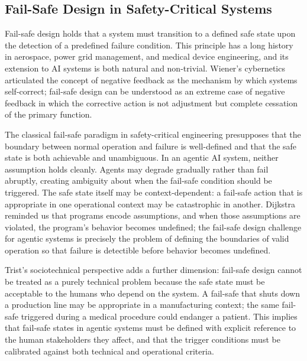 \subsection{Fail-Safe Design in Safety-Critical Systems}

Fail-safe design holds that a system must transition to a defined safe state upon the detection of a predefined failure condition. This principle has a long history in aerospace, power grid management, and medical device engineering, and its extension to AI systems is both natural and non-trivial. Wiener's cybernetics \cite{wiener1948} articulated the concept of negative feedback as the mechanism by which systems self-correct; fail-safe design can be understood as an extreme case of negative feedback in which the corrective action is not adjustment but complete cessation of the primary function.

The classical fail-safe paradigm in safety-critical engineering presupposes that the boundary between normal operation and failure is well-defined and that the safe state is both achievable and unambiguous. In an agentic AI system, neither assumption holds cleanly. Agents may degrade gradually rather than fail abruptly, creating ambiguity about when the fail-safe condition should be triggered. The safe state itself may be context-dependent: a fail-safe action that is appropriate in one operational context may be catastrophic in another. Dijkstra \cite{dijkstra1982} reminded us that programs encode assumptions, and when those assumptions are violated, the program's behavior becomes undefined; the fail-safe design challenge for agentic systems is precisely the problem of defining the boundaries of valid operation so that failure is detectible before behavior becomes undefined.

Trist's sociotechnical perspective \cite{tristr81} adds a further dimension: fail-safe design cannot be treated as a purely technical problem because the safe state must be acceptable to the humans who depend on the system. A fail-safe that shuts down a production line may be appropriate in a manufacturing context; the same fail-safe triggered during a medical procedure could endanger a patient. This implies that fail-safe states in agentic systems must be defined with explicit reference to the human stakeholders they affect, and that the trigger conditions must be calibrated against both technical and operational criteria.

